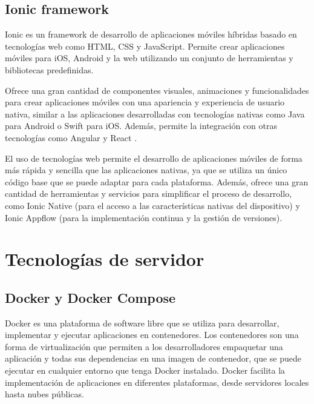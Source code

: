 \subsection{Ionic framework}
\label{subsec:ionic}

Ionic \cite{WEBSITE:ionic} es un framework de desarrollo de aplicaciones móviles híbridas basado en tecnologías web como HTML, CSS y JavaScript. Permite crear aplicaciones móviles para iOS, Android y la web utilizando un conjunto de herramientas y bibliotecas predefinidas.

Ofrece una gran cantidad de componentes visuales, animaciones y funcionalidades para crear aplicaciones móviles con una apariencia y experiencia de usuario nativa, similar a las aplicaciones desarrolladas con tecnologías nativas como Java para Android o Swift para iOS. Además, permite la integración con otras tecnologías como Angular \cite{WEBSITE:angular} y React \cite{WEBSITE:react}.

El uso de tecnologías web permite el desarrollo de aplicaciones móviles de forma más rápida y sencilla que las aplicaciones nativas, ya que se utiliza un único código base que se puede adaptar para cada plataforma. Además, ofrece una gran cantidad de herramientas y servicios para simplificar el proceso de desarrollo, como Ionic Native (para el acceso a las características nativas del dispositivo) y Ionic Appflow (para la implementación continua y la gestión de versiones).


\section{Tecnologías de servidor}
\label{sec:servidor}

\subsection{Docker y Docker Compose}
\label{subsec:docker}

Docker \cite{WEBSITE:docker} es una plataforma de software libre que se utiliza para desarrollar, implementar y ejecutar aplicaciones en contenedores. Los contenedores son una forma de virtualización que permiten a los desarrolladores empaquetar una aplicación y todas sus dependencias en una imagen de contenedor, que se puede ejecutar en cualquier entorno que tenga Docker instalado. Docker facilita la implementación de aplicaciones en diferentes plataformas, desde servidores locales hasta nubes públicas.

